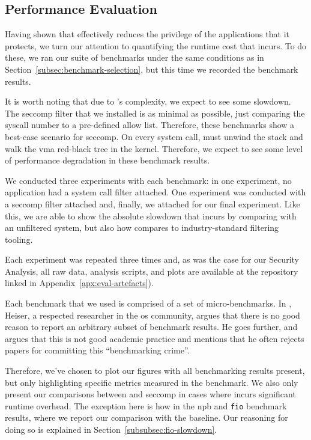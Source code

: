 \subsection{Performance Evaluation}\label{subsec:perf-eval}

Having shown that \af effectively reduces the privilege of the applications that
it protects, we turn our attention to quantifying the runtime cost that \af
incurs. To do these, we ran our suite of benchmarks under the same
conditions as in Section~\ref{subsec:benchmark-selection}, but this time we
recorded the benchmark results. 

It is worth noting that due to \af's complexity, we expect to see some slowdown.
The seccomp filter that we installed is as minimal as possible, just comparing
the syscall number to a pre-defined allow list. Therefore, these benchmarks show
a best-case scenario for seccomp. On every system call, \af must unwind the
stack and walk the \ac{vma} red-black tree in the kernel. Therefore, we expect
to see some level of performance degradation in these benchmark results.

We conducted three experiments with each benchmark: in one experiment, no
application had a system call filter attached. One experiment was conducted with
a seccomp filter attached and, finally, we attached \af for our final
experiment. Like this, we are able to show the absolute slowdown that \af
incurs by comparing with an unfiltered system, but also how \af compares to
industry-standard filtering tooling.

Each experiment was repeated three times and, as was the case for our Security
Analysis, all raw data, analysis scripts, and plots are available at the
repository linked in Appendix~\ref{apx:eval-artefacts}).

Each benchmark that we used is comprised of a set of micro-benchmarks. In
\textcite{HeiserBenchmarkingCrimes}, Heiser, a respected researcher in the
\ac{os} community, argues that there is no good reason to report an arbitrary
subset of benchmark results. He goes further, and argues that this is not good
academic practice and mentions that he often rejects papers for committing this
``benchmarking crime''. 

Therefore, we've chosen to plot our figures with all benchmarking results
present, but only highlighting specific metrics measured in the benchmark. We
also only present our comparisons between \af and seccomp in cases where \af
incurs significant runtime overhead. The exception here is how in the \ac{npb}
and \texttt{fio} benchmark results, where we report our comparison with the
baseline. Our reasoning for doing so is explained in 
Section~\ref{subsubsec:fio-slowdown}. 

